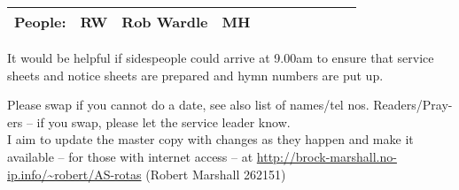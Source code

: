 \documentclass[10pt]{article}
\begin{document}
\begin{center}
\vspace{1em}
\begin{tabular}{|c|c|c|c|c|c|c|c|c|c|c|}\hline
{\bf People: } &
RW & Rob Wardle & MH &  &  & \\
     \hline
  \end{tabular}
\end{center}
\begin{minipage}{0.7\textwidth}
{\footnotesize It would be helpful if sidespeople 
could arrive at 9.00am to ensure that service sheets and notice sheets are 
prepared and hymn numbers are put up.

Please swap if you cannot do a date, see also list of names/tel nos.
Readers/Pray-ers -- if you swap, please let the service leader know.\\
I aim to update the master copy with changes as they
happen and make it available -- for those with internet access
\linebreak -- at
\url{http://brock-marshall.no-ip.info/~robert/AS-rotas}
(Robert Marshall 262151)}
\end{minipage}
\end{document}
